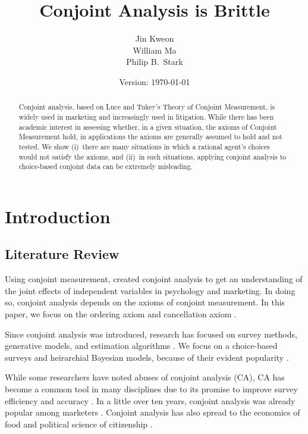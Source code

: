\documentclass[12pt]{article}
\title{Conjoint Analysis is Brittle}
\author{
   Jin Kweon\\
   William Ma\\
   Philip B.~Stark
}
\date{Version: \today}
\begin{document}
\maketitle


\begin{abstract}
Conjoint analysis, based on Luce and Tukey's Theory of Conjoint Measurement,
is widely used in marketing and increasingly used in litigation.
While there has been academic interest in assessing whether, in a given situation,
the axioms of Conjoint Measurement hold, in applications the axioms
are generally assumed to hold and not tested.
We show (i)~there are many situations in which a rational agent's choices would
not satisfy the axioms, and (ii)~in such situations, applying conjoint analysis
to choice-based conjoint data can be extremely misleading.
\end{abstract}

\section{Introduction}

\subsection{Literature Review}
Using conjoint measurement, \citet{green_conjoint_1971} created conjoint analysis to get an understanding of the joint effects of independent variables in psychology and marketing. In doing so, conjoint analysis depends on the axioms of conjoint measurement. In this paper, we focus on the ordering axiom and cancellation axiom \citep{luce_simultaneous_1964}. 


Since conjoint analysis was introduced, research has focused on 
survey methods, generative models, and estimation algorithms \citep{green_hybrid_1984, green_conjoint_1990, allenby_using_1995, lenk_hierarchical_1996, moore_cross-validity_1998}. 
We focus on a choice-based surveys and heirarchial Bayesian models, because of their
evident popularity \citep{noauthor_cbc/hb_2009, orme_which_2013}. 

While some researchers have noted abuses of conjoint analysis (CA), CA has become a common tool in many disciplines due to its promise to improve survey efficiency and accuracy \citep{cliff_article_1992, louviere_discrete_2010}. In a little over ten years, conjoint analysis was already popular among marketers \citep{cattin_commercial_1982, wittink_commercial_1989}. Conjoint analysis has also spread to the economics of food and political science of citizenship \citep{wilson-jeanselme_competing_2005, darby_decomposing_2008, burnett_consumer_2011, hainmueller_who_2013, hainmueller_causal_2014, hainmueller_validating_2015}.
\end{document}
